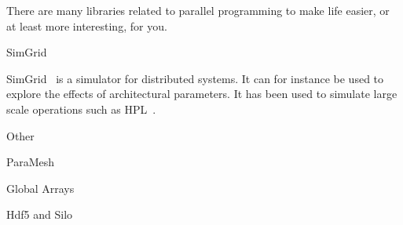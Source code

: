
There are many libraries related to parallel programming to make life
easier, or at least more interesting, for you.

 {SimGrid}

SimGrid~\cite{simgrid-homepage} is a simulator for distributed
systems. It can for instance be used to explore the effects of
architectural parameters. It has been used to simulate large scale
operations such as \ac{HPL}~\cite{cornebize:EmulateHPCms}.

 {Other}

ParaMesh

Global Arrays

Hdf5 and Silo

